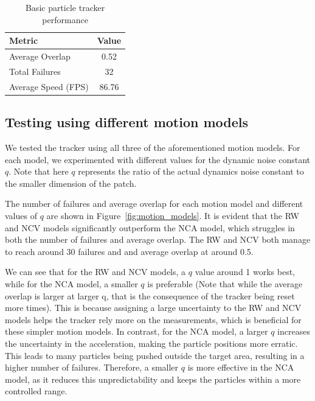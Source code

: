 \documentclass[9pt]{IEEEtran}
\begin{document}
\begin{table}[h]
  \centering
  \begin{tabular}{l|c}

  \textbf{Metric} & \textbf{Value} \\
  \hline 
  Average Overlap & 0.52 \\
  Total Failures & 32 \\
  Average Speed (FPS) & 86.76 \\

  \end{tabular}
  \vspace{3pt}
  \caption{Basic particle tracker performance}
  \label{tab:pf_tracker_results}
  \end{table}

\subsection{Testing using different motion models}
We tested the tracker using all three of the aforementioned motion models. For each model,
 we experimented with different values for the dynamic noise constant \(q\). Note that here \(q\) 
 represents the ratio of the actual dynamics noise constant to the smaller
   dimension of the patch.

   The number of failures and average overlap for each motion model and different 
   values of \(q\) are shown in Figure~\ref{fig:motion_models}. It is evident that 
   the RW and NCV models significantly outperform
    the NCA model, which struggles in both the number of
     failures and average overlap. The RW and NCV both manage to reach around 30 failures and 
     and average overlap at around 0.5.

     We can see that for the RW and NCV models, a \( q \) value around 1 works best,
      while for the NCA model, a smaller \( q \) is preferable (Note that while the average overlap 
      is larger at larger q, that is the consequence of the tracker being reset more times). This is because assigning a 
      large uncertainty to the RW and NCV models helps the tracker rely more on the measurements,
       which is beneficial for these simpler motion models. In contrast, for the NCA model, a 
       larger \( q \) increases the uncertainty in the acceleration, making the particle positions
        more erratic. This leads to many particles being pushed outside the target area, resulting 
        in a higher number of failures. Therefore, a smaller \( q \) is more effective in the NCA
         model, as it reduces this unpredictability and keeps the particles within a more controlled
          range. 
\end{document}
